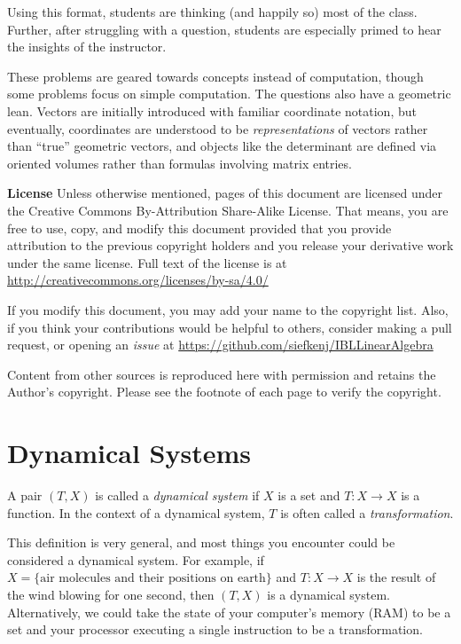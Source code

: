 {Using this format, students are thinking (and happily so) most of the class. Further,
after struggling with a question, students are especially primed to hear the insights of the instructor.

These problems are geared towards concepts instead of computation, though some problems
focus on simple computation. The questions also have a geometric lean. Vectors are initially
introduced with familiar coordinate notation, but eventually, coordinates are understood to be
\emph{representations} of vectors rather than ``true'' geometric vectors, and objects like the
determinant are defined via oriented volumes rather than formulas involving matrix entries.

\bigskip
{\bf License} Unless otherwise mentioned, pages of this document are licensed under
the Creative Commons By-Attribution Share-Alike License. That means, you are free
to use, copy, and modify this document provided that you provide attribution to the
previous copyright holders and you release your derivative work under the same license.
Full text of the license is at \url{http://creativecommons.org/licenses/by-sa/4.0/}

If you modify this document, you may add your name to the copyright list. Also,
if you think your contributions would be helpful to others, consider making a
pull request, or opening an \emph{issue} at \url{https://github.com/siefkenj/IBLLinearAlgebra}

Content from other sources is reproduced here with permission and retains the
Author's copyright. Please see the footnote of each page to verify the
copyright.

\newpage
}


\setcounter{page}{1}
\pagestyle{siefken}



	\section*{Dynamical Systems}

	\begin{definition}
		A pair $(T,X)$ is called a \emph{dynamical system} if
		$X$ is a set and $T:X\to X$ is a function. In the context of
		a dynamical system, $T$ is often called a \emph{transformation}.
	\end{definition}

	This definition is very general, and most things you encounter could be considered
	a dynamical system. For example, if $X=\{\text{air molecules and their positions on earth}\}$
	and $T:X\to X$ is the result of the wind blowing for one second, then $(T,X)$ is a dynamical system.
	Alternatively, we could take the state of your computer's memory (RAM) to be a set and your processor executing a single
	instruction to be a transformation.

